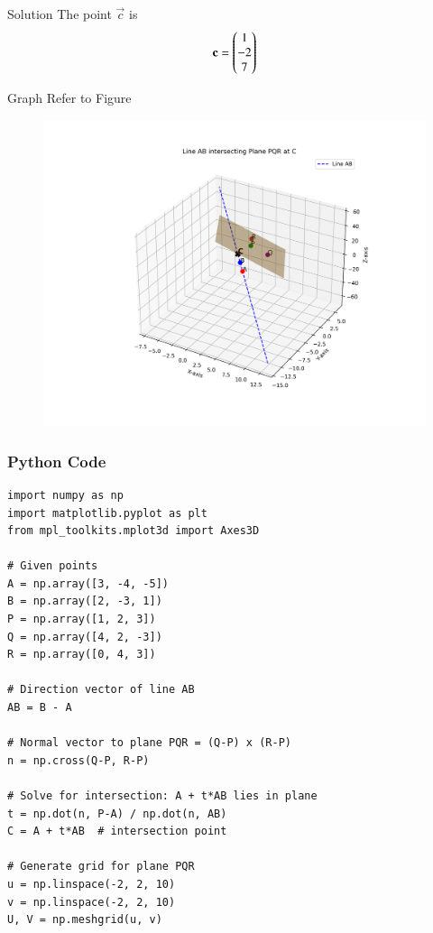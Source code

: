 \documentclass{beamer}
\begin{document}
\begin{frame}{Solution}
   The point $\vec{c}$ is
\begin{align}
    \mathbf{c}=\begin{pmatrix}1
                   \\
                   -2
                   \\
                   7
             \end{pmatrix}
\end{align} 
\end{frame}





\begin{frame}{Graph}
   Refer to Figure

\begin{figure}[H]
\begin{center}
\includegraphics[width=0.6\columnwidth]{../figs/graph8.png}
\end{center}
\caption{}
\label{fig:Fig}
\end{figure}  
\end{frame}




\begin{frame}[fragile]
    \frametitle{Python Code}
    \begin{lstlisting}
import numpy as np
import matplotlib.pyplot as plt
from mpl_toolkits.mplot3d import Axes3D

# Given points
A = np.array([3, -4, -5])
B = np.array([2, -3, 1])
P = np.array([1, 2, 3])
Q = np.array([4, 2, -3])
R = np.array([0, 4, 3])

# Direction vector of line AB
AB = B - A

# Normal vector to plane PQR = (Q-P) x (R-P)
n = np.cross(Q-P, R-P)

# Solve for intersection: A + t*AB lies in plane
t = np.dot(n, P-A) / np.dot(n, AB)
C = A + t*AB  # intersection point

# Generate grid for plane PQR
u = np.linspace(-2, 2, 10)
v = np.linspace(-2, 2, 10)
U, V = np.meshgrid(u, v)
\end{lstlisting}
\end{frame}
\end{document}
